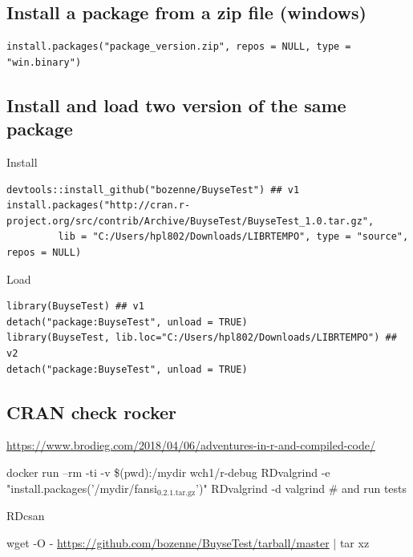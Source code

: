 \documentclass{article}
\begin{document}
\subsection{Install a package from a zip file (windows)}
\label{sec:orgafc0c46}
\lstset{language=r,label= ,caption= ,captionpos=b,numbers=none}
\begin{lstlisting}
install.packages("package_version.zip", repos = NULL, type = "win.binary")
\end{lstlisting}
\subsection{Install and load two version of the same package}
\label{sec:orgf21de01}

Install
\lstset{language=r,label= ,caption= ,captionpos=b,numbers=none}
\begin{lstlisting}
devtools::install_github("bozenne/BuyseTest") ## v1
install.packages("http://cran.r-project.org/src/contrib/Archive/BuyseTest/BuyseTest_1.0.tar.gz", 
		 lib = "C:/Users/hpl802/Downloads/LIBRTEMPO", type = "source", repos = NULL)
\end{lstlisting}

Load 
\lstset{language=r,label= ,caption= ,captionpos=b,numbers=none}
\begin{lstlisting}
library(BuyseTest) ## v1
detach("package:BuyseTest", unload = TRUE)
library(BuyseTest, lib.loc="C:/Users/hpl802/Downloads/LIBRTEMPO") ## v2
detach("package:BuyseTest", unload = TRUE)
\end{lstlisting}

\subsection{CRAN check rocker}
\label{sec:org9adf868}
\url{https://www.brodieg.com/2018/04/06/adventures-in-r-and-compiled-code/}

docker run --rm -ti -v \$(pwd):/mydir wch1/r-debug
RDvalgrind -e "install.packages('/mydir/fansi\(_{\text{0.2.1.tar.gz}}\)')"
RDvalgrind -d valgrind  \# and run tests

RDcsan

wget -O - \url{https://github.com/bozenne/BuyseTest/tarball/master} | tar xz
\end{document}
